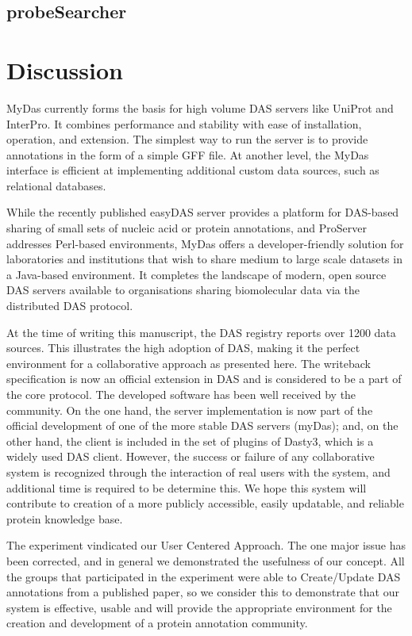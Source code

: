 \subsection{probeSearcher}
\section{Discussion}
MyDas currently forms the basis for high volume DAS servers like UniProt and InterPro. It combines performance and stability with ease of installation, operation, and extension. The simplest way to run the server is to provide annotations in the form of a simple GFF file. At another level, the MyDas interface is efficient at implementing additional custom data sources, such as relational databases.

While the recently published easyDAS server provides a platform for DAS-based sharing of small sets of nucleic acid or protein annotations, and ProServer addresses Perl-based environments, MyDas offers a developer-friendly solution for laboratories and institutions that wish to share medium to large scale datasets in a Java-based environment. It completes the landscape of modern, open source DAS servers available to organisations sharing biomolecular data via the distributed DAS protocol. 

At the time of writing this manuscript, the DAS registry reports over 1200 data sources. This illustrates the high adoption of DAS, making it the perfect environment for a collaborative approach as presented here. The writeback specification is now an official extension in DAS and is considered to be a part of the core protocol. The developed software has been well received by the community. On the one hand, the server implementation is now part of the official development of one of the more stable DAS servers (myDas); and, on the other hand, the client is included in the set of plugins of Dasty3, which is a widely used DAS client. However, the success or failure of any collaborative system is recognized through the interaction of real users with the system, and additional time is required to be determine this. We hope this system will contribute to creation of a more publicly accessible, easily updatable, and reliable protein knowledge base.

The experiment vindicated our User Centered Approach. The one major issue has been corrected, and in general we demonstrated the usefulness of our concept. All the groups that participated in the experiment were able to Create/Update DAS annotations from a published paper, so we consider this to demonstrate that our system is effective, usable and will provide the appropriate environment for the creation and development of a protein annotation community.

